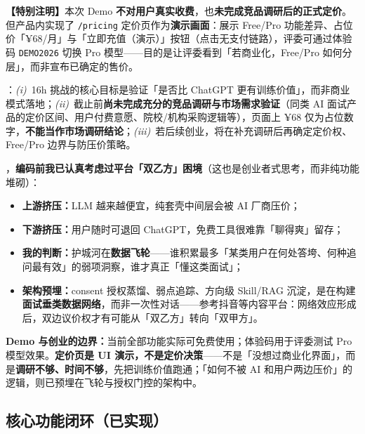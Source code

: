 \documentclass[11pt, a4paper]{article}
\begin{document}
\begin{bizbox}
\textbf{【特别注明】}本次 Demo \textbf{不对用户真实收费}，也\textbf{未完成竞品调研后的正式定价}。但产品内实现了 \texttt{/pricing} 定价页作为\textbf{演示画面}：展示 Free/Pro 功能差异、占位价「¥68/月」与「立即充值（演示）」按钮（点击无支付链路），评委可通过体验码 \texttt{DEMO2026} 切换 Pro 模型——目的是让评委看到「若商业化，Free/Pro 如何分层」，而非宣布已确定的售价。

\vspace{0.35em}
：\emph{(i)}~16h 挑战的核心目标是验证「是否比 ChatGPT 更有训练价值」，而非商业模式落地；\emph{(ii)}~截止前\textbf{尚未完成充分的竞品调研与市场需求验证}（同类 AI 面试产品的定价区间、用户付费意愿、院校/机构采购逻辑等），页面上 ¥68 仅为占位数字，\textbf{不能当作市场调研结论}；\emph{(iii)}~若后续创业，将在补充调研后再确定定价权、Free/Pro 边界与防压价策略。

\vspace{0.35em}
，\textbf{编码前我已认真考虑过平台「双乙方」困境}（这也是创业者式思考，而非纯功能堆砌）：
\begin{itemize}[topsep=2pt, itemsep=1pt]
  \item \textbf{上游挤压：}LLM 越来越便宜，纯套壳中间层会被 AI 厂商压价；
  \item \textbf{下游挤压：}用户随时可退回 ChatGPT，免费工具很难靠「聊得爽」留存；
  \item \textbf{我的判断：}护城河在\textbf{数据飞轮}——谁积累最多「某类用户在何处答垮、何种追问最有效」的弱项洞察，谁才真正「懂这类面试」；
  \item \textbf{架构预埋：}consent 授权蒸馏、弱点追踪、方向级 Skill/RAG 沉淀，是在构建\textbf{面试垂类数据网络}，而非一次性对话——参考抖音等内容平台：网络效应形成后，双边议价权才有可能从「双乙方」转向「双甲方」。
\end{itemize}

\vspace{0.25em}
\noindent\textbf{Demo 与创业的边界：}当前全部功能实际可免费使用；体验码用于评委测试 Pro 模型效果。\textbf{定价页是 UI 演示，不是定价决策}——不是「没想过商业化界面」，而是\textbf{调研不够、时间不够}，先把训练价值跑通；「如何不被 AI 和用户两边压价」的逻辑，则已预埋在飞轮与授权门控的架构中。
\end{bizbox}

\subsection{核心功能闭环（已实现）}
\end{document}
